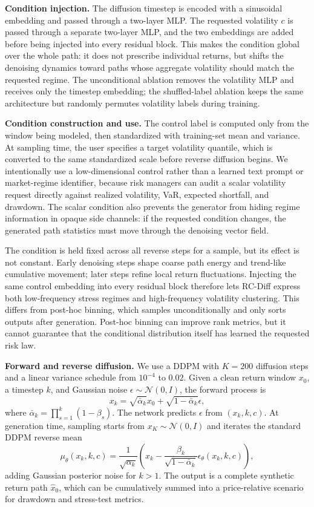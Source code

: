 \documentclass[letterpaper]{article}
\begin{document}
\textbf{Condition injection.} The diffusion timestep is encoded with a sinusoidal embedding and passed through a two-layer MLP. The requested volatility $c$ is passed through a separate two-layer MLP, and the two embeddings are added before being injected into every residual block. This makes the condition global over the whole path: it does not prescribe individual returns, but shifts the denoising dynamics toward paths whose aggregate volatility should match the requested regime. The unconditional ablation removes the volatility MLP and receives only the timestep embedding; the shuffled-label ablation keeps the same architecture but randomly permutes volatility labels during training.

\textbf{Condition construction and use.} The control label is computed only from the window being modeled, then standardized with training-set mean and variance. At sampling time, the user specifies a target volatility quantile, which is converted to the same standardized scale before reverse diffusion begins. We intentionally use a low-dimensional control rather than a learned text prompt or market-regime identifier, because risk managers can audit a scalar volatility request directly against realized volatility, VaR, expected shortfall, and drawdown. The scalar condition also prevents the generator from hiding regime information in opaque side channels: if the requested condition changes, the generated path statistics must move through the denoising vector field.

The condition is held fixed across all reverse steps for a sample, but its effect is not constant. Early denoising steps shape coarse path energy and trend-like cumulative movement; later steps refine local return fluctuations. Injecting the same control embedding into every residual block therefore lets RC-Diff express both low-frequency stress regimes and high-frequency volatility clustering. This differs from post-hoc binning, which samples unconditionally and only sorts outputs after generation. Post-hoc binning can improve rank metrics, but it cannot guarantee that the conditional distribution itself has learned the requested risk law.

\textbf{Forward and reverse diffusion.} We use a DDPM with $K=200$ diffusion steps and a linear variance schedule from $10^{-4}$ to $0.02$. Given a clean return window $x_0$, a timestep $k$, and Gaussian noise $\epsilon\sim\mathcal{N}(0,I)$, the forward process is
\begin{equation}
  x_k=\sqrt{\bar{\alpha}_k}x_0+\sqrt{1-\bar{\alpha}_k}\epsilon,
\end{equation}
where $\bar{\alpha}_k=\prod_{s=1}^k(1-\beta_s)$. The network predicts $\epsilon$ from $(x_k,k,c)$. At generation time, sampling starts from $x_K\sim\mathcal{N}(0,I)$ and iterates the standard DDPM reverse mean
\begin{equation}
  \mu_\theta(x_k,k,c)=\frac{1}{\sqrt{\alpha_k}}\left(x_k-\frac{\beta_k}{\sqrt{1-\bar{\alpha}_k}}\epsilon_\theta(x_k,k,c)\right),
\end{equation}
adding Gaussian posterior noise for $k>1$. The output is a complete synthetic return path $\hat{x}_0$, which can be cumulatively summed into a price-relative scenario for drawdown and stress-test metrics.
\end{document}
